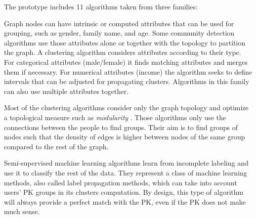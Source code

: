 The prototype includes 11 algorithms taken from three families:
\begin{description}[leftmargin=0pt,nosep]
\item[Attribute based algorithms.] Graph nodes can have intrinsic or computed attributes that can be used for grouping, such as gender, family name, and age. Some community detection algorithms use those attributes alone or together with the topology to partition the graph.
A clustering algorithm considers attributes according to their type. For categorical attributes (\eg male/female) it finds matching attributes and merges them if necessary. For numerical attributes (\eg income) the algorithm seeks to define intervals that can be adjusted for propagating clusters.
Algorithms in this family can also use multiple attributes together.

\item[Topology-based algorithms.] Most of the clustering algorithms consider only the graph topology and optimize a topological measure such as \emph{modularity} \cite{brandesModularityClustering2008}.
Those algorithms only use the connections between the people to find groups.
Their aim is to find groups of nodes such that the density of edges is higher between nodes of the same group compared to the rest of the graph.

\item[Propagation/Learning-based algorithms.] Semi-supervised machine learning algorithms learn from incomplete labeling and use it to classify the rest of the data. They represent a class of machine learning methods, also called label propagation methods, which can take into account users' PK groups in its clusters computation.
By design, this type of algorithm will always provide a perfect match with the PK, even if the PK does not make much sense.

\end{description}


